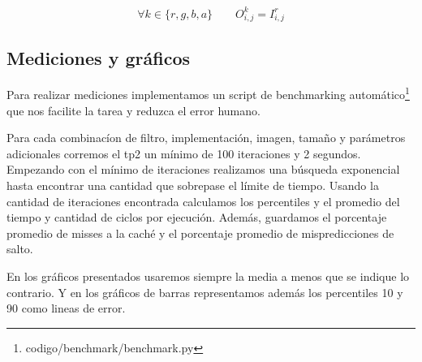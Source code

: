 $$\forall k \in \{r,g,b,a\} \qquad O^k_{i,j} = I^r_{i,j}$$

\subsection{Mediciones y gráficos}

Para realizar mediciones implementamos un script de benchmarking automático\footnote{codigo/benchmark/benchmark.py} que nos facilite la tarea y reduzca el error humano.

Para cada combinacíon de filtro, implementación, imagen, tamaño y parámetros adicionales corremos el tp2 un mínimo de 100 iteraciones y 2 segundos. Empezando con el mínimo de iteraciones realizamos una búsqueda exponencial hasta encontrar una cantidad que sobrepase el límite de tiempo. Usando la cantidad de iteraciones encontrada calculamos los percentiles y el promedio del tiempo y cantidad de ciclos por ejecución. Además, guardamos el porcentaje promedio de misses a la caché y el porcentaje promedio de mispredicciones de salto.

En los gráficos presentados usaremos siempre la media a menos que se indique lo contrario. Y en los gráficos de barras representamos además los percentiles 10 y 90 como lineas de error.

